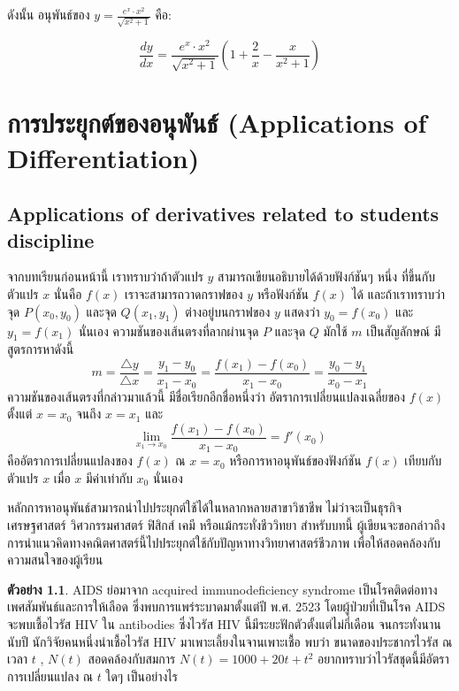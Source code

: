 \documentclass[
]{book}
\theoremstyle{definition}
\theoremstyle{definition}
\newtheorem{example}{ตัวอย่าง}[chapter]
\theoremstyle{definition}
\theoremstyle{definition}
\theoremstyle{remark}
\begin{document}
ดังนั้น อนุพันธ์ของ \(y = \frac{e^x \cdot x^2}{\sqrt{x^2 + 1}}\) คือ:

\[ \boxed{\frac{dy}{dx} = \frac{e^x \cdot x^2}{\sqrt{x^2 + 1}} \left( 1 + \frac{2}{x} - \frac{x}{x^2 + 1} \right)} \]

\chapter{การประยุกต์ของอนุพันธ์ (Applications of Differentiation)}\label{uxe01uxe32uxe23uxe1buxe23uxe30uxe22uxe01uxe15uxe02uxe2duxe07uxe2duxe19uxe1euxe19uxe18-applications-of-differentiation}

\section{Applications of derivatives related to students discipline}\label{applications-of-derivatives-related-to-students-discipline}

จากบทเรียนก่อนหน้านี้ เราทราบว่าถ้าตัวแปร \(y\) สามารถเขียนอธิบายได้ด้วยฟังก์ชันๆ หนึ่ง
ที่ขึ้นกับตัวแปร \(x\) นั่นคือ \(f(x)\) เราจะสามารถวาดกราฟของ \(y\) หรือฟังก์ชัน \(f(x)\) ได้
และถ้าเราทราบว่า จุด \(P(x_0,y_0)\) และจุด \(Q(x_1,y_1)\) ต่างอยู่บนกราฟของ \(y\)
แสดงว่า \(y_0=f(x_0)\) และ \(y_1=f(x_1)\) นั่นเอง ความชันของเส้นตรงที่ลากผ่านจุด \(P\)
และจุด \(Q\) มักใช้ \(m\) เป็นสัญลักษณ์ มีสูตรการหาดังนี้
\[m=\frac{\triangle y}{\triangle x}=\frac{y_1-y_0}{ x_1-x_0}=\frac{f(x_1)-f(x_0)}{ x_1-x_0}=\frac{y_0-y_1}{ x_0-x_1}\]
ความชันของเส้นตรงที่กล่าวมาแล้วนี้ มีชื่อเรียกอีกชื่อหนึ่งว่า อัตราการเปลี่ยนแปลงเฉลี่ยของ
\(f(x)\) ตั้งแต่ \(x=x_0\) จนถึง \(x=x_1\) และ
\[\lim_{x_1 \rightarrow x_0} \frac{f(x_1)-f(x_0)}{ x_1-x_0} =f'(x_0)\]
คืออัตราการเปลี่ยนแปลงของ \(f(x)\) ณ \(x=x_0\) หรือการหาอนุพันธ์ของฟังก์ชัน \(f(x)\)
เทียบกับตัวแปร \(x\) เมื่อ \(x\) มีค่าเท่ากับ \(x_0\) นั่นเอง

หลักการหาอนุพันธ์สามารถนำไปประยุกต์ใช้ได้ในหลากหลายสาขาวิชาชีพ ไม่ว่าจะเป็นธุรกิจ
เศรษฐศาสตร์ วิศวกรรมศาสตร์ ฟิสิกส์ เคมี หรือแม้กระทั่งชีววิทยา สำหรับบทนี้
ผู้เขียนจะขอกล่าวถึง การนำแนวคิดทางคณิตศาสตร์นี้ไปประยุกต์ใช้กับปัญหาทางวิทยาศาสตร์ชีวภาพ
เพื่อให้สอดคล้องกับความสนใจของผู้เรียน

\begin{example}
AIDS ย่อมาจาก acquired immunodeficiency syndrome
เป็นโรคติดต่อทางเพศสัมพันธ์และการให้เลือด ซึ่งพบการแพร่ระบาดมาตั้งแต่ปี พ.ศ. 2523
โดยผู้ป่วยที่เป็นโรค AIDS จะพบเชื้อไวรัส HIV ใน antibodies ซึ่งไวรัส HIV
นี้มีระยะฟักตัวตั้งแต่ไม่กี่เดือน จนกระทั่งนานนับปี นักวิจัยคนหนึ่งนำเชื้อไวรัส HIV
มาเพาะเลี้ยงในจานเพาะเชื้อ พบว่า ขนาดของประชากรไวรัส ณ เวลา \(t\) , \(N(t)\)
สอดคล้องกับสมการ \(N(t)=1000+20t+t^2\) อยากทราบว่าไวรัสชุดนี้มีอัตราการเปลี่ยนแปลง ณ
\(t\) ใดๆ เป็นอย่างไร
\end{example}
\end{document}
